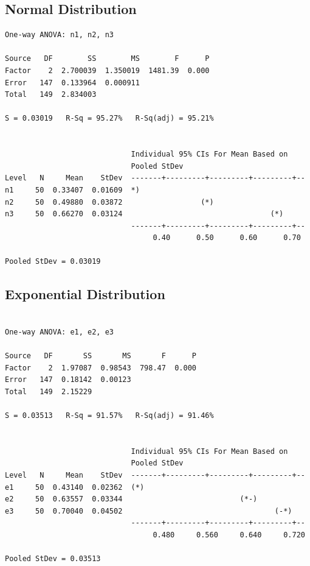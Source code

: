 \documentclass[letterpaper,10pt]{article}
\begin{document}
\subsection{Normal Distribution}
\begin{samepage}
\begin{verbatim}
One-way ANOVA: n1, n2, n3 

Source   DF        SS        MS        F      P
Factor    2  2.700039  1.350019  1481.39  0.000
Error   147  0.133964  0.000911
Total   149  2.834003

S = 0.03019   R-Sq = 95.27%   R-Sq(adj) = 95.21%


                             Individual 95% CIs For Mean Based on
                             Pooled StDev
Level   N     Mean    StDev  -------+---------+---------+---------+--
n1     50  0.33407  0.01609  *)
n2     50  0.49880  0.03872                  (*)
n3     50  0.66270  0.03124                                  (*)
                             -------+---------+---------+---------+--
                                  0.40      0.50      0.60      0.70

Pooled StDev = 0.03019
\end{verbatim}
\end{samepage}
\subsection{Exponential Distribution}
\begin{samepage}
\begin{verbatim}

One-way ANOVA: e1, e2, e3 

Source   DF       SS       MS       F      P
Factor    2  1.97087  0.98543  798.47  0.000
Error   147  0.18142  0.00123
Total   149  2.15229

S = 0.03513   R-Sq = 91.57%   R-Sq(adj) = 91.46%


                             Individual 95% CIs For Mean Based on
                             Pooled StDev
Level   N     Mean    StDev  -------+---------+---------+---------+--
e1     50  0.43140  0.02362  (*)
e2     50  0.63557  0.03344                           (*-)
e3     50  0.70040  0.04502                                   (-*)
                             -------+---------+---------+---------+--
                                  0.480     0.560     0.640     0.720

Pooled StDev = 0.03513
\end{verbatim}
\end{samepage}
\end{document}
